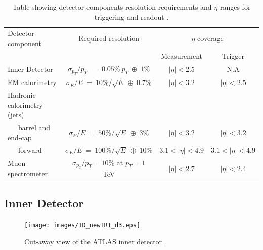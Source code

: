 	\begin {table}[h]
	\begin{center}
	\begin{tabular}{ | l | c | c | c | } 
		\hline
		Detector component & Required resolution & \multicolumn{2}{c|}{$\eta$ coverage} \\
		 & & Measurement & Trigger \\
    	\hline\hline
    	Inner Detector & $\sigma_{p_{T}}/p_{T}~~=~0.05\%~p_{T}~\oplus~1\%$ & $|\eta|<2.5$ & N.A \\
    	\hline
    	EM calorimetry & $\sigma_{E}/E~=~10\%/\sqrt{E}~\oplus~0.7\%$ & $|\eta|<3.2$ & $|\eta|<2.5$ \\
    	\hline
    	Hadronic calorimetry (jets) &  &  &  \\
    	~~~barrel and end-cap & $\sigma_{E}/E~=~50\%/\sqrt{E}~\oplus~3\%$ & $|\eta|<3.2$ & $|\eta|<3.2$ \\
    	~~~forward  & $\sigma_{E}/E~=~100\%/\sqrt{E}~\oplus~10\%$ & $3.1<|\eta|<4.9$ & $3.1<|\eta|<4.9$ \\
    	\hline
    	Muon spectrometer & $\sigma_{p_{T}}/p_{T} =10\%$ at $p_{T} = 1$ TeV & $|\eta|<2.7$ & $|\eta|<2.4$ \\
    	\hline
  	\end{tabular}
  	\label{tab:det_res}
  	\caption{Table showing detector components resolution requirements and $\eta$ ranges for triggering and readout \cite{Aad:1129811}.}
  	\end{center}
	\end {table}




	\subsection{Inner Detector}

		\begin{figure}[h]
			\begin{center}
				\texttt{[image: images/ID\_newTRT\_d3.eps]}
			\end{center}
			\caption{Cut-away view of the ATLAS inner detector \cite{Aad:1129811}.}
			\label{fig:ATLAS_inner}
		\end{figure}

